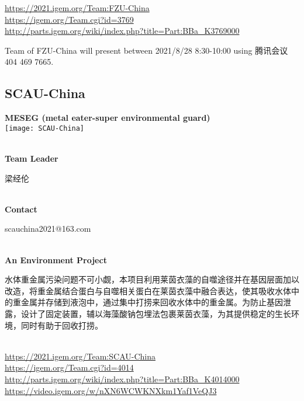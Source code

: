 \url{https://2021.igem.org/Team:FZU-China }\\
\url{https://igem.org/Team.cgi?id=3769 }\\
\url{http://parts.igem.org/wiki/index.php?title=Part:BBa_K3769000 }\\


\vfill{}









Team of FZU-China will present between    2021/8/28 8:30-10:00     using 腾讯会议 404 469 7665.
\newpage


\subsection{\textcolor{Blu}{ SCAU-China } }
\vspace{5mm}
\begin{center}
\large{
  \textbf{ MESEG (metal eater-super environmental guard) }\\

  \texttt{[image: SCAU-China]}
}
\end{center}
\textbf{\\Team Leader}

  梁经伦


\textbf{\\Contact}

  scauchina2021@163.com

\textbf{\\An Environment Project\\}\begin{spacing}{1.5}

水体重金属污染问题不可小觑，本项目利用莱茵衣藻的自噬途径并在基因层面加以改造，将重金属结合蛋白与自噬相关蛋白在莱茵衣藻中融合表达，使其吸收水体中的重金属并存储到液泡中，通过集中打捞来回收水体中的重金属。为防止基因泄露，设计了固定装置，辅以海藻酸钠包埋法包裹莱茵衣藻，为其提供稳定的生长环境，同时有助于回收打捞。\end{spacing}
\\

\url{https://2021.igem.org/Team:SCAU-China }\\
\url{https://igem.org/Team.cgi?id=4014 }\\
\url{http://parts.igem.org/wiki/index.php?title=Part:BBa_K4014000 }\\
\url{https://video.igem.org/w/nXN6WCWKNXkm1Yaf1VeQJ3 }\\

